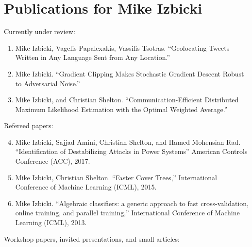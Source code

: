 \documentclass[12pt]{article}
\begin{document}
\section*{Publications for Mike Izbicki}

\noindent
Currently under review:
\begin{enumerate}
\item
Mike Izbicki, Vagelis Papalexakis, Vassilis Tsotras.
``Geolocating Tweets Written in Any Language Sent from Any Location.''

\item
Mike Izbicki.
``Gradient Clipping Makes Stochastic Gradient Descent Robust to Adversarial Noise.''

\item
Mike Izbicki, and Christian Shelton.
``Communication-Efficient Distributed Maximum Likelihood Estimation with the Optimal Weighted Average.''

\end{enumerate}

\noindent
Refereed papers:

\begin{enumerate}
\setcounter{enumi}{3}
\item
Mike Izbicki, Sajjad Amini, Christian Shelton, and Hamed Mohensian-Rad.
``Identification of Destabilizing Attacks in Power Systems''
American Controls Conference (ACC),
2017.

\item
Mike Izbicki, Christian Shelton.
``Faster Cover Trees,''
International Conference of Machine Learning (ICML),
2015.

\item
Mike Izbicki.
``Algebraic classifiers: a generic approach to fast cross-validation, online training, and parallel training,''
International Conference of Machine Learning (ICML),
2013.
\end{enumerate}

\noindent
Workshop papers, invited presentations, and small articles:
\end{document}
